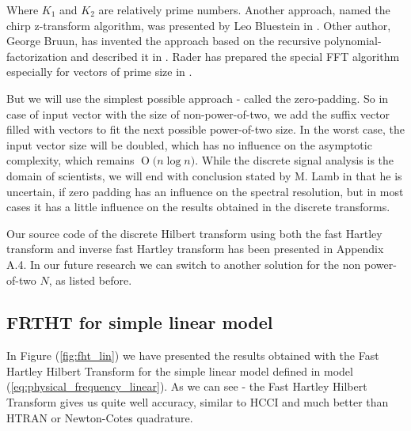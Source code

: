 \documentclass[12pt,twoside,a4paper]{article}
\numberwithin{equation}{subsection}
\numberwithin{figure}{subsection}
\newcommand{\BigO}[1]{\ensuremath{\operatorname{O}\bigl(#1\bigr)}}
\begin{document}
Where $K_1$ and $K_2$ are relatively prime numbers. Another approach, named the chirp z-transform algorithm, was presented by Leo Bluestein in \cite{bluestein_linear}. Other author, George Bruun, has invented the approach based on the recursive polynomial-factorization and described it in \cite{bruun_ztransform}. Rader has prepared the special FFT algorithm especially for vectors of prime size in \cite{rader_dicrete}. 

But we will use the simplest possible approach - called the zero-padding. So in case of input vector with the size of non-power-of-two, we add the suffix vector filled with vectors to fit the next possible power-of-two size. In the worst case, the input vector size will be doubled, which has no influence on the asymptotic complexity, which remains $\BigO{n \log n}$. While the discrete signal analysis is the domain of scientists, we will end with conclusion stated by M. Lamb in \cite{lamb_issues} that he is uncertain, if zero padding has an influence on the spectral resolution, but in most cases it has a little influence on the results obtained in the discrete transforms.

Our source code of the discrete Hilbert transform using both the fast Hartley transform and inverse fast Hartley transform has been presented in Appendix A.4. In our future research we can switch to another solution for the non power-of-two $N$, as listed before.

\subsection{FRTHT for simple linear model} \label{chap:hartley_lin}

In Figure (\ref{fig:fht_lin}) we have presented the results obtained with the Fast Hartley Hilbert Transform for the simple linear model defined in model (\ref{eq:physical_frequency_linear}). As we can see - the Fast Hartley Hilbert Transform gives us quite well accuracy, similar to HCCI and much better than HTRAN or Newton-Cotes quadrature.
\end{document}
